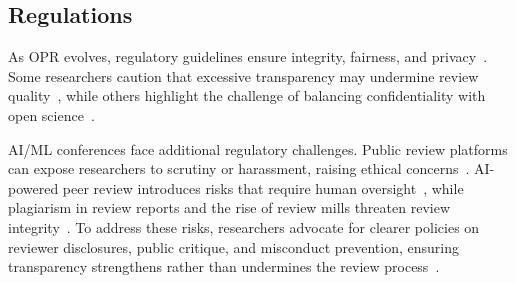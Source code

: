 \subsection{Regulations}

As OPR evolves, regulatory guidelines ensure integrity, fairness, and privacy~\cite{ross2019guidelines}. Some researchers caution that excessive transparency may undermine review quality~\cite{bianchi2022can}, while others highlight the challenge of balancing confidentiality with open science~\cite{baez2002confidentiality, dennis2019privacy}.

AI/ML conferences face additional regulatory challenges. Public review platforms can expose researchers to scrutiny or harassment, raising ethical concerns~\cite{wang2023have}. AI-powered peer review introduces risks that require human oversight~\cite{seghier2024ai}, while plagiarism in review reports and the rise of review mills threaten review integrity~\cite{piniewski2024emerging, oviedo2024review, ezhumalai2024design}. To address these risks, researchers advocate for clearer policies on reviewer disclosures, public critique, and misconduct prevention, ensuring transparency strengthens rather than undermines the review process~\cite{kaltenbrunner2022innovating, kuznetsov2024can}.











